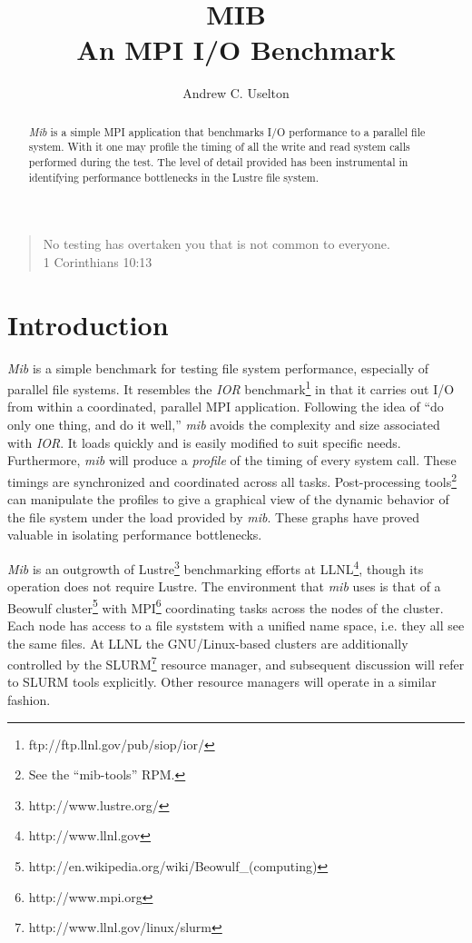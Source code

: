 \documentclass{article}
\author{Andrew C. Uselton}
\title{
  MIB \\
  An MPI I/O Benchmark
}
\begin{document}
\maketitle

\begin{quote}
No testing has overtaken you that is not common to everyone. \\
1 Corinthians 10:13
\end{quote}


\begin{abstract} 
{\em Mib} is a simple MPI application that benchmarks I/O performance to a
parallel file system.  With it one may profile the timing of all the
write and read system calls performed during the test.  The level of
detail provided has been instrumental in identifying performance
bottlenecks in the Lustre file system.
\end{abstract}

\section{Introduction}\label{section.introduction}


{\em Mib} is a simple benchmark for testing file system performance,
especially of parallel file systems.  It resembles the {\em IOR}
benchmark\footnote{ftp://ftp.llnl.gov/pub/siop/ior/} in that it
carries out I/O from within a coordinated, parallel MPI application.
Following the idea of ``do only one thing, and do it well,'' {\em mib}
avoids the complexity and size associated with {\em IOR}.  It loads
quickly and is easily modified to suit specific needs.  Furthermore,
{\em mib} will produce a {\em profile} of the timing of every system
call.  These timings are synchronized and coordinated across all
tasks.  Post-processing tools\footnote{See the ``mib-tools'' RPM.} can
manipulate the profiles to give a graphical view of the dynamic
behavior of the file system under the load provided by {\em mib}.
These graphs have proved valuable in isolating performance
bottlenecks.

{\em Mib} is an outgrowth of Lustre\footnote{http://www.lustre.org/}
benchmarking efforts at LLNL\footnote{http://www.llnl.gov}, though its
operation does not require Lustre.  The environment that {\em mib}
uses is that of a Beowulf
cluster\footnote{http://en.wikipedia.org/wiki/Beowulf\_(computing)} with
MPI\footnote{http://www.mpi.org} 
coordinating tasks across the nodes of the cluster.  Each node has
access to a file syststem with a unified name space, i.e. they all see
the same files.  At LLNL the GNU/Linux-based clusters are additionally
controlled by the SLURM\footnote{http://www.llnl.gov/linux/slurm} resource
manager, and subsequent discussion will refer to SLURM tools
explicitly.  Other resource managers will operate in a similar
fashion.  
\end{document}

